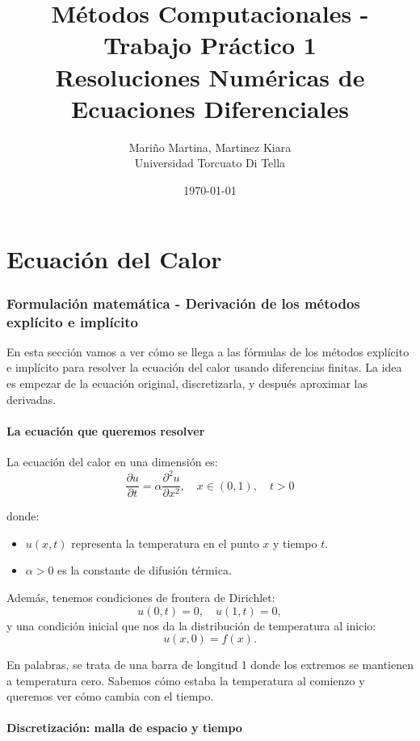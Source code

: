 \documentclass[12pt,a4paper]{article}
\title{\textbf{Métodos Computacionales - Trabajo Práctico 1}\\
Resoluciones Numéricas de Ecuaciones Diferenciales}
\author{
    Mariño Martina, Martinez Kiara\\ 
    Universidad Torcuato Di Tella
}
\date{\today}
\begin{document}
\maketitle
\thispagestyle{empty}
\newpage

\tableofcontents
\newpage


\part{Ecuación del Calor}

\section{Formulación matemática - Derivación de los métodos explícito e implícito}

En esta sección vamos a ver cómo se llega a las fórmulas de los métodos explícito e implícito para resolver la ecuación del calor usando diferencias finitas.  
La idea es empezar de la ecuación original, discretizarla, y después aproximar las derivadas.

\subsection{La ecuación que queremos resolver}

La ecuación del calor en una dimensión es:
\[
\frac{\partial u}{\partial t} = \alpha \frac{\partial^2 u}{\partial x^2},
\quad x \in (0,1), \quad t > 0
\]

donde:
\begin{itemize}
    \item $u(x,t)$ representa la temperatura en el punto $x$ y tiempo $t$.
    \item $\alpha > 0$ es la constante de difusión térmica.
\end{itemize}

Además, tenemos condiciones de frontera de Dirichlet:
\[
u(0,t) = 0, \quad u(1,t) = 0,
\]
y una condición inicial que nos da la distribución de temperatura al inicio:
\[
u(x,0) = f(x).
\]

En palabras, se trata de una barra de longitud 1 donde los extremos se mantienen a temperatura cero.  
Sabemos cómo estaba la temperatura al comienzo y queremos ver cómo cambia con el tiempo.

\subsection{Discretización: malla de espacio y tiempo}
\end{document}
